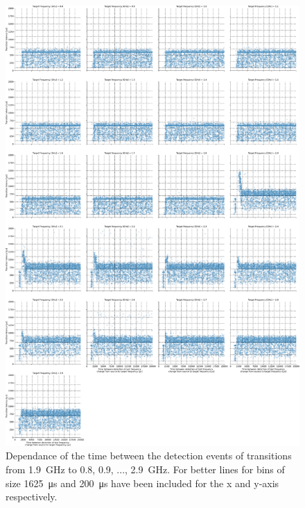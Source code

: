 \begin{figure}[]
    \centering
    \includegraphics[width=\columnwidth]{fig/ftalat_scatter_wait_transition_latency_hati_source_1.9.pdf}
    \caption{Dependance of the time between the detection events of transitions from \SI{1.9}{\GHz} to \SI{0.8}{}, \SI{0.9}{}, ..., \SI{2.9}{\GHz}. For better lines for bins of size \SI{1625}{\us} and \SI{200}{\us} have been included for the x and y-axis respectively.}
\end{figure}
